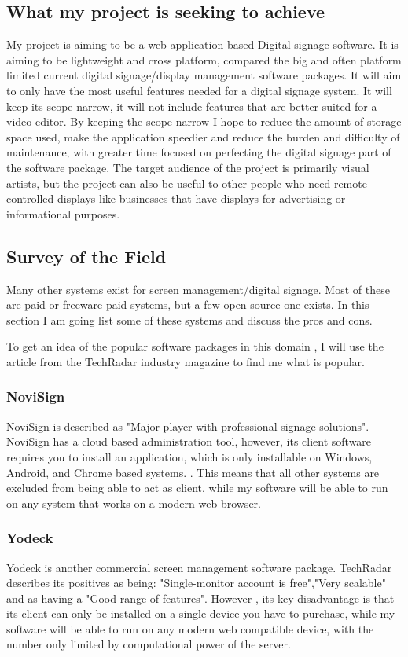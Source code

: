 \documentclass{article}
\begin{document}
\subsection{What my project is seeking to achieve}
My project is aiming to be a web application based Digital signage software. It is aiming to be lightweight and cross platform, compared the big and often platform limited current digital signage/display management software packages. It will aim to only have the most useful features needed for a digital signage system. It will keep its scope narrow, it will not include features that are better suited for a video editor. By keeping the scope narrow I hope to reduce the amount of storage space used, make the application speedier and reduce the burden and difficulty of maintenance, with greater time focused on perfecting the digital signage part of the software package. The target audience of the project is primarily visual artists, but the project can also be useful to other people who need remote controlled displays like businesses that have displays for advertising  or informational purposes.

\subsection{Survey of the Field}
Many other systems exist for screen management/digital signage. Most of these are paid or freeware paid systems, but a few open source one exists. In this section I am going list some of these systems and discuss the pros and cons.

To get an idea of the popular software packages in this domain , I will use the article from the TechRadar industry magazine \cite{allen2021} to find me what is popular.
\subsubsection{NoviSign}
NoviSign is described as "Major player with professional signage solutions". NoviSign has a cloud based administration tool, however, its client software requires you to install an application, which is only installable on Windows, Android, and Chrome based systems.  \cite{novisign}. This means that all other systems are excluded from being able to act as client, while my software will be able to run on any system that works on a modern web browser.


\subsubsection{ Yodeck}
Yodeck is another commercial screen management software package. TechRadar describes its positives as being: "Single-monitor account is free","Very scalable" and as having a "Good range of features". However , its key disadvantage is that its client can only be installed on a single device you have to purchase\cite{allen2021}, while my software will be able to run on any modern web compatible device, with the number only limited by computational power of the server.
\end{document}
